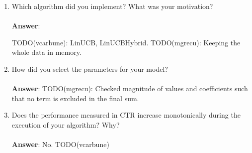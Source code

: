 \documentclass[11pt]{article}
\begin{document}
\begin{enumerate}
\item Which algorithm did you implement? What was your motivation? \\ \\
\textbf{Answer}:

TODO(vcarbune): LinUCB, LinUCBHybrid.
TODO(mgrecu): Keeping the whole data in memory.

\item How did you select the parameters for your model? \\ \\
\textbf{Answer}:
TODO(mgrecu): Checked magnitude of values and coefficients such that no
term is excluded in the final sum.

\item Does the performance measured in CTR increase monotonically during the
execution of your algorithm? Why? \\ \\
\textbf{Answer}: No. TODO(vcarbune)

\end{enumerate}
\end{document}
